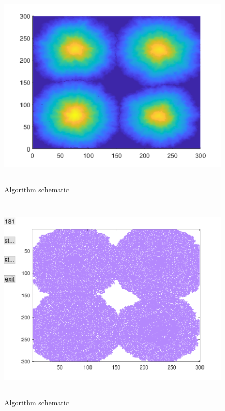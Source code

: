 \documentclass{mcmthesis}
\begin{document}
\begin{figure}[H] 
	\centering 
	\includegraphics[height=10cm]{./T5Figure/K1N2/K1N2A.pdf}
	\caption{Algorithm schematic}
\end{figure}
\begin{figure}[H] 
	\centering 
	\includegraphics[height=10cm]{./T5Figure/K1N2/K1N2F.pdf}
	\caption{Algorithm schematic}
\end{figure}
\end{document}
